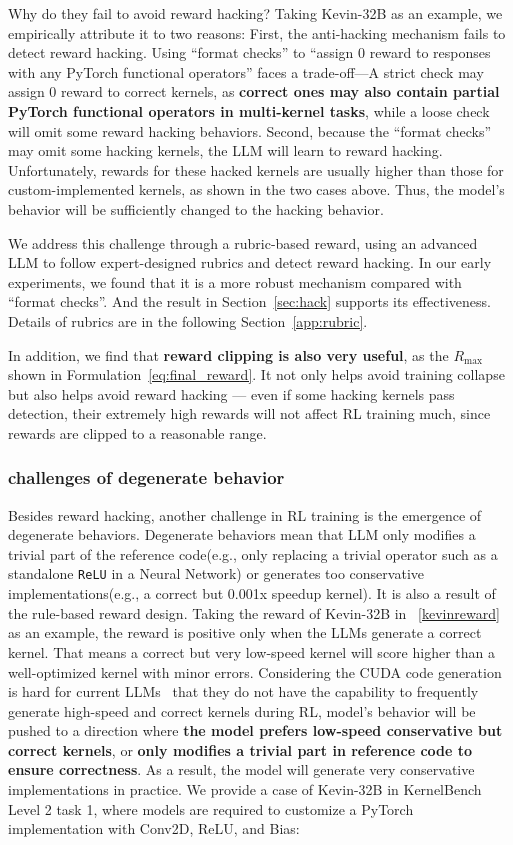 Why do they fail to avoid reward hacking? Taking Kevin-32B as an example, we empirically attribute it to two reasons: First, the anti-hacking mechanism fails to detect reward hacking. Using “format checks” to “assign 0 reward to responses with any PyTorch
functional operators” faces a trade-off---A strict check may assign 0 reward to correct kernels, as \textbf{correct ones may also contain partial PyTorch functional operators in multi-kernel tasks}, while a loose check will omit some reward hacking behaviors. Second, because the “format checks” may omit some hacking kernels, the LLM will learn to reward hacking. Unfortunately, rewards for these hacked kernels are usually higher than those for custom-implemented kernels, as shown in the two cases above. Thus, the model's behavior will be sufficiently changed to the hacking behavior. 

We address this challenge through a rubric-based reward, using an advanced LLM to follow expert-designed rubrics and detect reward hacking. In our early experiments, we found that it is a more robust mechanism compared with “format checks”. And the result in Section~\ref{sec:hack} supports its effectiveness. Details of rubrics are in the following Section~\ref{app:rubric}. 

In addition, we find that \textbf{reward clipping is also very useful}, as the $R_{\max}$ shown in Formulation~\ref{eq:final_reward}. It not only helps avoid training collapse but also helps avoid reward hacking — even if some hacking kernels pass detection, their extremely high rewards will not affect RL training much, since rewards are clipped to a reasonable range.  

\subsubsection{challenges of degenerate behavior}
\label{app:fear}
Besides reward hacking, another challenge in RL training is the emergence of degenerate behaviors. Degenerate behaviors mean that LLM only modifies a trivial part of the reference code(e.g., only replacing a trivial operator such as a standalone \texttt{ReLU} in a Neural Network) or generates too conservative implementations(e.g., a correct but 0.001x speedup kernel). It is also a result of the rule-based reward design. Taking the reward of Kevin-32B in ~\ref{kevinreward} as an example, the reward is positive only when the LLMs generate a correct kernel. That means a correct but very low-speed kernel will score higher than a well-optimized kernel with minor errors. Considering the CUDA code generation is hard for current LLMs~\cite{kernelbench} that they do not have the capability to frequently generate high-speed and correct kernels during RL, model's behavior will be pushed to a direction where \textbf{the model prefers low-speed conservative but correct kernels}, or \textbf{only modifies a trivial part in reference code to ensure correctness}. As a result, the model will generate very conservative implementations in practice. We provide a case of Kevin-32B in KernelBench Level 2 task 1, where models are required to customize a PyTorch implementation with Conv2D, ReLU, and Bias:


